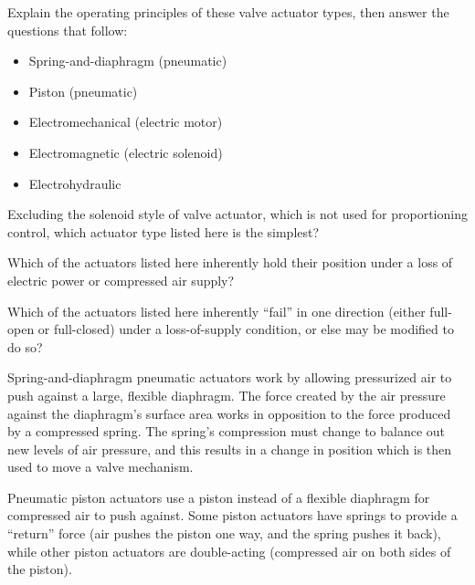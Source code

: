 

Explain the operating principles of these valve actuator types, then answer the questions that follow:

\begin{itemize}
\item{}Spring-and-diaphragm (pneumatic)
\item{}Piston (pneumatic)
\item{}Electromechanical (electric motor)
\item{}Electromagnetic (electric solenoid)
\item{}Electrohydraulic
\end{itemize}

\vskip 10pt

Excluding the solenoid style of valve actuator, which is not used for proportioning control, which actuator type listed here is the simplest?

\vskip 10pt

Which of the actuators listed here inherently hold their position under a loss of electric power or compressed air supply?

\vskip 10pt

Which of the actuators listed here inherently ``fail'' in one direction (either full-open or full-closed) under a loss-of-supply condition, or else may be modified to do so?







Spring-and-diaphragm pneumatic actuators work by allowing pressurized air to push against a large, flexible diaphragm.  The force created by the air pressure against the diaphragm's surface area works in opposition to the force produced by a compressed spring.  The spring's compression must change to balance out new levels of air pressure, and this results in a change in position which is then used to move a valve mechanism.

\vskip 10pt

Pneumatic piston actuators use a piston instead of a flexible diaphragm for compressed air to push against.  Some piston actuators have springs to provide a ``return'' force (air pushes the piston one way, and the spring pushes it back), while other piston actuators are double-acting (compressed air on both sides of the piston).

